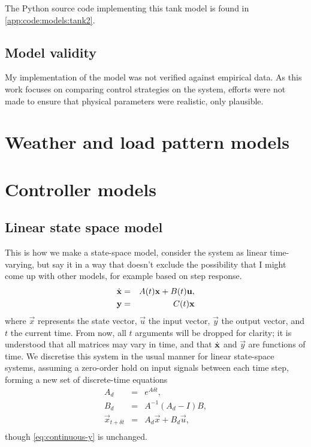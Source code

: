 The Python source code implementing this tank model is found in \autoref{app:code:models:tank2}.

\subsection{Model validity}

My implementation of the model was not verified against empirical data.
As this work focuses on comparing control strategies on the system, efforts were not made to ensure that physical parameters were realistic, only plausible.

\section{Weather and load pattern models}


\section{Controller models}

\subsection{Linear state space model}

This is how we make a state-space model, consider the system as linear time-varying, but say it in a way that doesn't exclude the possibility that I might come up with other models, for example based on step response.
\begin{eqnarray}
   \label{eq:continuous-xdot}
   \dot{\mathbf{x}} &=& A(t) \mathbf{x} + B(t) \mathbf{u}, \\
   \label{eq:continuous-y}
   \mathbf{y} &=& C(t) \mathbf{x}
\end{eqnarray}
where $\vec{x}$ represents the state vector, $\vec{u}$ the input vector, $\vec{y}$ the output vector, and $t$ the current time.
From now, all $t$ arguments will be dropped for clarity; it is understood that all matrices may vary in time, and that $\dot{\mathbf{x}}$ and $\vec{y}$ are functions of time.
We discretise this system in the usual manner for linear state-space systems, assuming a zero-order hold on input signals between each time step, forming a new set of discrete-time equations
\begin{eqnarray}
   \label{eq:discretise-A}
   A_d &=& e^{A \delta t}, \\
   \label{eq:discretise-B}
   B_d &=& A^{-1} (A_d - I) B, \\
   \label{eq:discrete-xdot}
   \vec{x}_{t + \delta t} &=& A_d \vec{x} + B_d \vec{u}, \\
\end{eqnarray}
though \autoref{eq:continuous-y} is unchanged.

